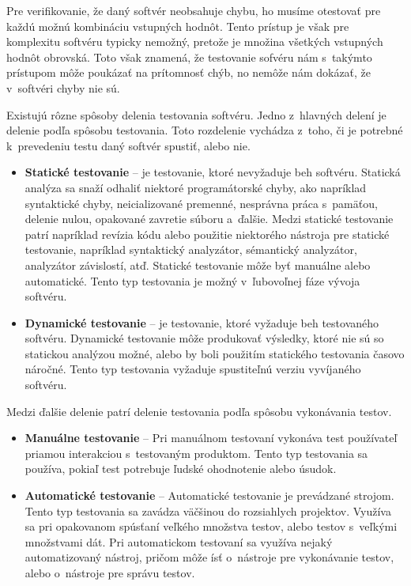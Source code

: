 Pre verifikovanie, že daný softvér neobsahuje chybu, ho musíme otestovať
pre každú možnú kombináciu vstupných hodnôt. Tento prístup je však pre 
komplexitu softvéru typicky nemožný, pretože je množina všetkých vstupných
hodnôt obrovská. Toto však znamená, že testovanie sofvéru nám s~takýmto 
prístupom môže poukázať na prítomnosť chýb, no nemôže nám dokázať, 
že v~softvéri chyby nie sú.

Existujú rôzne spôsoby delenia testovania softvéru. 
Jedno z~hlavných delení je delenie podľa spôsobu testovania.
Toto rozdelenie vychádza z~toho, či je potrebné k~prevedeniu 
testu daný softvér spustiť, alebo nie.
\begin{itemize}
\item \textbf{Statické testovanie} --
je testovanie, ktoré nevyžaduje beh softvéru. 
Statická analýza sa snaží odhaliť niektoré programátorské chyby, 
ako napríklad syntaktické chyby, neicializované premenné, 
nesprávna práca s~pamäťou, delenie nulou, opakované zavretie súboru 
a~ďalšie. 
Medzi statické testovanie patrí napríklad revízia kódu alebo použitie 
niektorého nástroja pre statické testovanie, napríklad 
syntaktický analyzátor, sémantický analyzátor, analyzátor závislostí, atď. 
Statické testovanie môže byť manuálne alebo automatické. 
Tento typ testovania je možný v~ľubovoľnej fáze vývoja softvéru.

\item \textbf{Dynamické testovanie} -- 
je testovanie, ktoré vyžaduje beh testovaného softvéru. 
Dynamické testovanie môže produkovať výsledky, ktoré nie sú so statickou 
analýzou možné, alebo by boli použitím statického testovania časovo náročné. 
Tento typ testovania vyžaduje spustiteľnú verziu vyvíjaného softvéru.
\end{itemize}


\noindent Medzi ďalšie delenie patrí delenie testovania podľa spôsobu 
vykonávania testov.
\begin{itemize}
\item \textbf{Manuálne testovanie} --
Pri manuálnom testovaní vykonáva test používateľ priamou interakciou 
s~testovaným produktom. Tento typ testovania sa používa, pokiaľ test 
potrebuje ľudské ohodnotenie alebo úsudok.

\item \textbf{Automatické testovanie} --
Automatické testovanie je prevádzané strojom.
Tento typ testovania sa zavádza väčšinou do rozsiahlych projektov.
Využíva sa pri opakovanom spúsťaní veľkého množstva testov, alebo testov
s~veľkými množstvami dát. Pri automatickom testovaní sa využíva nejaký 
automatizovaný nástroj, pričom môže ísť o~nástroje 
pre vykonávanie testov, alebo o~nástroje pre správu testov.
\end{itemize}

